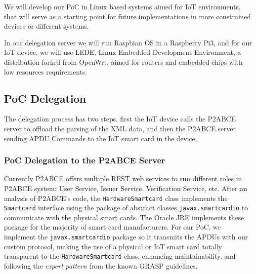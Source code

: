 \documentclass[journal]{IEEEtran}
\begin{document}
We will develop our PoC in Linux based systems aimed for IoT environments, that will serve as a starting point for future implementations in more constrained devices or different systems.

In our delegation server we will run Raspbian OS in a Raspberry Pi3, and for our IoT device, we will use LEDE, Linux Embedded Development Environment, a distribution forked from OpenWrt, aimed for routers and embedded chips with low resources requirements.



\subsection{PoC Delegation}

The delegation process has two steps, first the IoT device calls the P2ABCE server to offload the parsing of the XML data, and then the P2ABCE server sending APDU Commands to the IoT smart card in the device.


\subsubsection{PoC Delegation to the P2ABCE Server}


Currently P2ABCE offers multiple REST web services to run different roles in P2ABCE system: User Service, Issuer Service, Verification Service, etc. 
%
After an analysis of P2ABCE's code, the \texttt{HardwareSmartcard} class implements the \texttt{Smartcard} interface using the package of abstract classes \texttt{javax.smartcardio} to communicate with the physical smart cards. The Oracle JRE implements these package for the majority of smart card manufacturers. For our PoC, we implement the \texttt{javax.smartcardio} package so it transmits the APDUs with our custom protocol, making the use of a physical or IoT smart card totally transparent to the \texttt{HardwareSmartcard} class, enhancing maintainability, and following the \textit{expert pattern} from the known GRASP guidelines.
\end{document}

